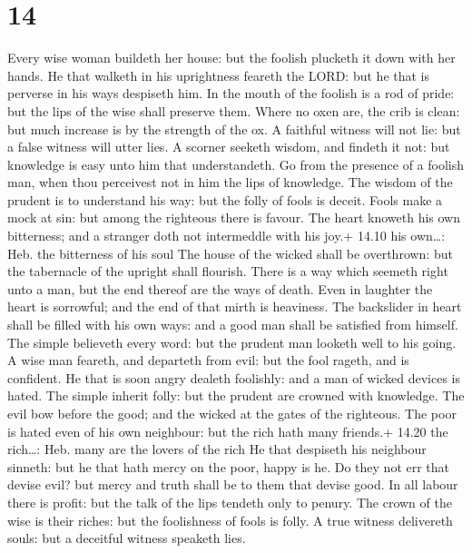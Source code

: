 \hypertarget{section-13}{%
\section{14}\label{section-13}}

 Every wise woman buildeth her house: but the foolish
plucketh it down with her hands.  He that walketh in his
uprightness feareth the LORD: but he that is perverse in his ways
despiseth him.  In the mouth of the foolish is a rod of
pride: but the lips of the wise shall preserve them.  Where
no oxen are, the crib is clean: but much increase is by the strength of
the ox.  A faithful witness will not lie: but a false
witness will utter lies.  A scorner seeketh wisdom, and
findeth it not: but knowledge is easy unto him that understandeth.
 Go from the presence of a foolish man, when thou perceivest
not in him the lips of knowledge.  The wisdom of the prudent
is to understand his way: but the folly of fools is deceit. 
Fools make a mock at sin: but among the righteous there is favour.
 The heart knoweth his own bitterness; and a stranger doth
not intermeddle with his joy.+ 14.10 his own\ldots: Heb. the bitterness
of his soul  The house of the wicked shall be overthrown:
but the tabernacle of the upright shall flourish.  There is
a way which seemeth right unto a man, but the end thereof are the ways
of death.  Even in laughter the heart is sorrowful; and the
end of that mirth is heaviness.  The backslider in heart
shall be filled with his own ways: and a good man shall be satisfied
from himself.  The simple believeth every word: but the
prudent man looketh well to his going.  A wise man feareth,
and departeth from evil: but the fool rageth, and is confident.
 He that is soon angry dealeth foolishly: and a man of
wicked devices is hated.  The simple inherit folly: but the
prudent are crowned with knowledge.  The evil bow before
the good; and the wicked at the gates of the righteous. 
The poor is hated even of his own neighbour: but the rich hath many
friends.+ 14.20 the rich\ldots: Heb. many are the lovers of the rich
 He that despiseth his neighbour sinneth: but he that hath
mercy on the poor, happy is he.  Do they not err that
devise evil? but mercy and truth shall be to them that devise good.
 In all labour there is profit: but the talk of the lips
tendeth only to penury.  The crown of the wise is their
riches: but the foolishness of fools is folly.  A true
witness delivereth souls: but a deceitful witness speaketh lies.

